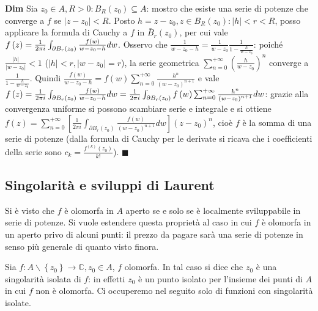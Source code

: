 \documentclass{article}
\begin{document}
\textbf{Dim} Sia $z_{0}\in A,R>0:B_{R}\left( z_{0}\right) \subseteq A$:
mostro che esiste una serie di potenze che converge a $f$ se $\left\vert
z-z_{0}\right\vert <R$. Posto $h=z-z_{0},z\in B_{R}\left( z_{0}\right)
:\left\vert h\right\vert <r<R$, posso applicare la formula di Cauchy a $f$
in $\bar{B}_{r}\left( z_{0}\right) $, per cui vale $f\left( z\right) =\frac{1%
}{2\pi i}\int_{\partial B_{r}\left( z_{0}\right) }\frac{f\left( w\right) }{%
w-z_{0}-h}dw$. Osservo che $\frac{1}{w-z_{0}-h}=\frac{1}{w-z_{0}}\frac{1}{1-%
\frac{h}{w-z_{0}}}$: poich\'{e} $\frac{\left\vert h\right\vert }{\left\vert
w-z_{0}\right\vert }<1$ ($\left\vert h\right\vert <r,\left\vert
w-z_{0}\right\vert =r$), la serie geometrica $\sum_{n=0}^{+\infty }\left( 
\frac{h}{w-z_{0}}\right) ^{n}$ converge a $\frac{1}{1-\frac{h}{w-z_{0}}}$.
Quindi $\frac{f\left( w\right) }{w-z_{0}-h}=f\left( w\right)
\sum_{n=0}^{+\infty }\frac{h^{n}}{\left( w-z_{0}\right) ^{n+1}}$ e vale $%
f\left( z\right) =\frac{1}{2\pi i}\int_{\partial B_{r}\left( z_{0}\right) }%
\frac{f\left( w\right) }{w-z_{0}-h}dw=\frac{1}{2\pi i}\int_{\partial
B_{r}\left( z_{0}\right) }f\left( w\right) \sum_{n=0}^{+\infty }\frac{h^{n}}{%
\left( w-z_{0}\right) ^{n+1}}dw$: grazie alla convergenza uniforme si
possono scambiare serie e integrale e si ottiene $f\left( z\right)
=\sum_{n=0}^{+\infty }\left[ \frac{1}{2\pi i}\int_{\partial B_{r}\left(
z_{0}\right) }\frac{f\left( w\right) }{\left( w-z_{0}\right) ^{n+1}}dw\right]
\left( z-z_{0}\right) ^{n}$, cio\`{e} $f$ \`{e} la somma di una serie di
potenze (dalla formula di Cauchy per le derivate si ricava che i
coefficienti della serie sono $c_{k}=\frac{f^{\left( k\right) }\left(
z_{0}\right) }{k!}$). $\blacksquare $

\subsection{Singolarit\`{a} e sviluppi di Laurent}

Si \`{e} visto che $f$ \`{e} olomorfa in $A$ aperto se e solo se \`{e}
localmente sviluppabile in serie di potenze. Si vuole estendere questa
propriet\`{a} al caso in cui $f$ \`{e} olomorfa in un aperto privo di alcuni
punti: il prezzo da pagare sar\`{a} una serie di potenze in senso pi\`{u}
generale di quanto visto finora.

Sia $f:A\backslash \left\{ z_{0}\right\} \rightarrow 
\mathbb{C}
,z_{0}\in A$, $f$ olomorfa. In tal caso si dice che $z_{0}$ \`{e} una
singolarit\`{a} isolata di $f$: in effetti $z_{0}$ \`{e} un punto isolato
per l'insieme dei punti di $A$ in cui $f$ non \`{e} olomorfa. Ci occuperemo
nel seguito solo di funzioni con singolarit\`{a} isolate.
\end{document}
